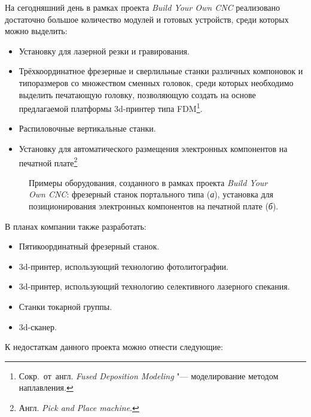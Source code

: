 На сегодняшний день в рамках проекта \textit{Build Your Own CNC} реализовано достаточно большое количество модулей и готовых устройств, среди которых можно выделить:

\begin{itemize}
	\item Установку для лазерной резки и гравирования.
	\item Трёхкоординатное фрезерные и сверлильные станки различных компоновок и типоразмеров со множеством сменных головок, среди которых необходимо выделить печатающую головку, позволяющую создать на основе предлагаемой платформы 3d-принтер типа FDM\footnote{Сокр.~от~англ. \textit{Fused Deposition Modeling} "--- моделирование методом наплавления.}.
	\item Распиловочные вертикальные станки.
	\item Установку для автоматического размещения электронных компонентов на печатной плате\footnote{Англ. \textit{Pick and Place machine}.}
\end{itemize}

\begin{figure}[ht]
	\caption[Примеры оборудования, созданного в рамках проекта \textit{Build Your Own CNC}]%
	{Примеры оборудования, созданного в рамках проекта \textit{Build Your Own CNC}: фрезерный станок портального типа (\textit{а}), установка для позиционирования электронных компонентов на печатной плате (\textit{б}).}\label{fig:byocnc}
\end{figure}

В планах компании также разработать:

\begin{itemize}
	\item Пятикоординатный фрезерный станок.	
	\item 3d-принтер, использующий технологию фотолитографии.
	\item 3d-принтер, использующий технологию селективного лазерного спекания.
	\item Станки токарной группы.
	\item 3d-сканер.
\end{itemize}

К недостаткам данного проекта можно отнести следующие:

